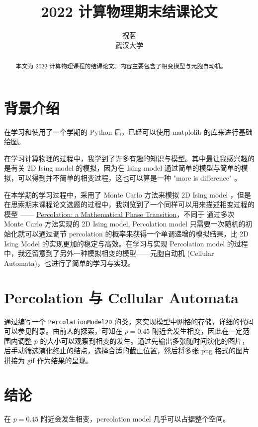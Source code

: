 \documentclass[bibend=bibtex,lang=cn,11pt,a4paper]{elegantpaper}
\title{2022 计算物理期末结课论文}
\author{祝茗 \\ 武汉大学}
\date{}
\begin{document}
\maketitle

\begin{abstract}
  本文为 $2022$ 计算物理课程的结课论文。内容主要包含了相变模型与元胞自动机。
\end{abstract}

\section{背景介绍}

在学习和使用了一个学期的 Python 后，已经可以使用 matplolib 的库来进行基础绘图。

在学习计算物理的过程中，我学到了许多有趣的知识与模型。其中最让我感兴趣的是有关 2D Ising model 的模拟，因为在 Ising model 通过简单的模型与简单的模拟，可以得到并不简单的相变过程，这也可以算是一种 "more is difference" \cite{MoreIsDifferent}。

在本学期的学习过程中，采用了 Monte Carlo 方法来模拟 2D Ising model ，但是在思索期末课程论文选题的过程中，我浏览到了一个同样可以用来描述相变过程的模型 —— \href{https://www.youtube.com/watch?v=a-767WnbaCQ}{Percolation: a Mathematical Phase Transition}，不同于 通过多次 Monte Carlo 方法实现的 2D Ising model, Percolation model 只需要一次随机的初始化就可以通过调节 percolation 的概率来获得一个单调递增的模拟结果，比 2D Ising Model 的实现更加的稳定与高效。在学习与实现 Percolation model 的过程中，我还留意到了另外一种模拟相变的模型——元胞自动机 (Cellular Automata)，也进行了简单的学习与实现。

\section{Percolation 与 Cellular Automata}

通过编写一个 \lstinline{PercolationModel2D} 的类，来实现模型中网格的存储，详细的代码可以参见附录。由前人的探索，可知在 $p=0.45$ 附近会发生相变，因此在一定范围内调整 $p$ 的大小可以观察到相变的发生。通过先输出多张随时间演化的图片，后手动筛选演化终止的结点，选择合适的截止位置，然后将多张 png 格式的图片拼接为 gif 作为结果的呈现。

\section{结论}

在 $p=0.45$ 附近会发生相变，percolation model 几乎可以占据整个空间。
\end{document}

